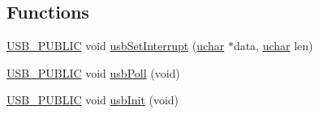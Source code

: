 \subsection*{Functions}
\begin{DoxyCompactItemize}
\item 
\hyperlink{mhvlib-_vusb-_console_2vusb_2usbdrv_8h_a5f6aa87267678dc37dd5d97a7b3df7c3}{U\-S\-B\-\_\-\-P\-U\-B\-L\-I\-C} void \hyperlink{mhvlib-_vusb-_keyboard_2vusb_2usbdrv_8c_aafa474a799eed02d362bfdfb8a36602c}{usb\-Set\-Interrupt} (\hyperlink{mhvlib-_vusb-_console_2vusb_2usbdrv_8h_aa8ddf20cdd716b652e76e23e5e700893}{uchar} $\ast$data, \hyperlink{mhvlib-_vusb-_console_2vusb_2usbdrv_8h_aa8ddf20cdd716b652e76e23e5e700893}{uchar} len)
\item 
\hyperlink{mhvlib-_vusb-_console_2vusb_2usbdrv_8h_a5f6aa87267678dc37dd5d97a7b3df7c3}{U\-S\-B\-\_\-\-P\-U\-B\-L\-I\-C} void \hyperlink{mhvlib-_vusb-_keyboard_2vusb_2usbdrv_8c_a188162c29eb62ffbd2d33763d20e12b4}{usb\-Poll} (void)
\item 
\hyperlink{mhvlib-_vusb-_console_2vusb_2usbdrv_8h_a5f6aa87267678dc37dd5d97a7b3df7c3}{U\-S\-B\-\_\-\-P\-U\-B\-L\-I\-C} void \hyperlink{mhvlib-_vusb-_keyboard_2vusb_2usbdrv_8c_a5672a0c07f0f8e93bde4579d278e6307}{usb\-Init} (void)
\end{DoxyCompactItemize}
